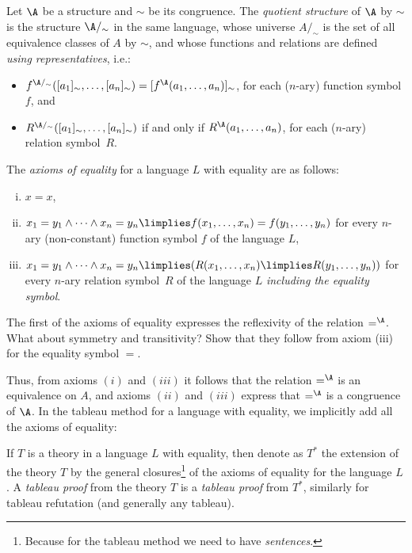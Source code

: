 \begin{definition}
    Let $\A$ be a structure and $\sim$ be its congruence. The \emph{quotient structure} of $\A$ by $\sim$ is the structure $\A/_\sim$ in the same language, whose universe $A/_\sim$ is the set of all equivalence classes of $A$ by $\sim$, and whose functions and relations are defined \emph{using representatives}, i.e.:
    \begin{itemize}
        \item $f^{\A/_\sim}([a_1]_\sim,\dots,[a_n]_\sim)=[f^\A(a_1,\dots,a_n)]_\sim$, for each ($n$-ary) function symbol $f$, and
        \item $R^{\A/_\sim}([a_1]_\sim,\dots,[a_n]_\sim)$ if and only if $R^\A(a_1,\dots,a_n)$, for each ($n$-ary) relation symbol~$R$.
    \end{itemize} 
    
\end{definition}


\begin{definition}
    The \emph{axioms of equality} for a language $L$ with equality are as follows:
    \begin{enumerate}[(i)]
        \item $x=x$,
        \item $x_1=y_1\land\cdots\land x_n=y_n\limplies f(x_1,\dots,x_n)=f(y_1,\dots,y_n)$ for every $n$-ary (non-constant) function symbol $f$ of the language $L$,
        \item $x_1=y_1\land\cdots\land x_n=y_n\limplies (R(x_1,\dots,x_n)\limplies R(y_1,\dots,y_n))$ for every $n$-ary relation symbol~$R$ of the language $L$ \emph{including the equality symbol}.
    \end{enumerate}
\end{definition}

\begin{exercise}
    The first of the axioms of equality expresses the reflexivity of the relation $=^\A$. What about symmetry and transitivity? Show that they follow from axiom (iii) for the equality symbol $=$.
\end{exercise}

Thus, from axioms $(i)$ and $(iii)$ it follows that the relation $=^\A$ is an equivalence on $A$, and axioms $(ii)$ and $(iii)$ express that $=^\A$ is a congruence of $\A$. In the tableau method for a language with equality, we implicitly add all the axioms of equality:

\begin{definition}
    If $T$ is a theory in a language $L$ with equality, then denote as $T^*$ the extension of the theory $T$ by the general closures\footnote{Because for the tableau method we need to have \emph{sentences}.} of the axioms of equality for the language $L$. A \emph{tableau proof} from the theory $T$ is a \emph{tableau proof} from $T^*$, similarly for tableau refutation (and generally any tableau).    
\end{definition}

